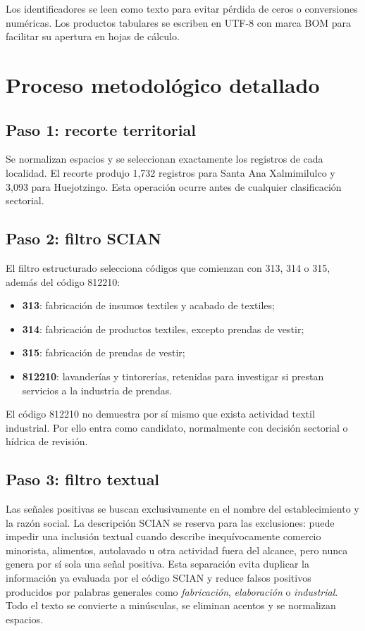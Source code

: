 \documentclass[11pt,letterpaper]{article}
\begin{document}
Los identificadores se leen como texto para evitar pérdida de ceros o conversiones numéricas. Los productos tabulares se escriben en UTF-8 con marca BOM para facilitar su apertura en hojas de cálculo.

\section{Proceso metodológico detallado}

\subsection{Paso 1: recorte territorial}

Se normalizan espacios y se seleccionan exactamente los registros de cada localidad. El recorte produjo 1,732 registros para Santa Ana Xalmimilulco y 3,093 para Huejotzingo. Esta operación ocurre antes de cualquier clasificación sectorial.

\subsection{Paso 2: filtro SCIAN}

El filtro estructurado selecciona códigos que comienzan con 313, 314 o 315, además del código 812210:

\begin{itemize}
  \item \textbf{313}: fabricación de insumos textiles y acabado de textiles;
  \item \textbf{314}: fabricación de productos textiles, excepto prendas de vestir;
  \item \textbf{315}: fabricación de prendas de vestir;
  \item \textbf{812210}: lavanderías y tintorerías, retenidas para investigar si prestan servicios a la industria de prendas.
\end{itemize}

El código 812210 no demuestra por sí mismo que exista actividad textil industrial. Por ello entra como candidato, normalmente con decisión sectorial o hídrica de revisión.

\subsection{Paso 3: filtro textual}

Las señales positivas se buscan exclusivamente en el nombre del establecimiento y la razón social. La descripción SCIAN se reserva para las exclusiones: puede impedir una inclusión textual cuando describe inequívocamente comercio minorista, alimentos, autolavado u otra actividad fuera del alcance, pero nunca genera por sí sola una señal positiva. Esta separación evita duplicar la información ya evaluada por el código SCIAN y reduce falsos positivos producidos por palabras generales como \emph{fabricación}, \emph{elaboración} o \emph{industrial}. Todo el texto se convierte a minúsculas, se eliminan acentos y se normalizan espacios.
\end{document}
